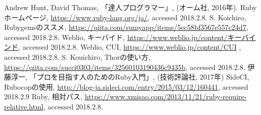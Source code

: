 \begin{thebibliography}{9}
 Andrew Hunt, David Thomas, 「達人プログラマー」, (オーム社, 2016年).
 Ruby ホームページ, \url{https://www.ruby-lang.org/ja/}, accessed 2018.2.8.
 S. Koichiro, Rubygemsのススメ, \url{https://qiita.com/sumyapp/items/5ec58bf3567e557c24d7}, accessed 2018.2.8.
 Weblio, キーバイド, \url{https://www.weblio.jp/content/キーバインド}, accessed 2018.2.8.
 Weblio, CUI, \url{https://www.weblio.jp/content/CUI} , accessed 2018.2.8.
 S. Kouichiro, Thorの使い方, \url{https://qiita.com/succi0303/items/32560103190436c9435b}, accessed 2018.2.8.
 伊藤淳一, 「プロを目指す人のためのRuby入門」, (技術評論社, 2017年)
 SideCI, Rubocopの使用, \url{http://blog-ja.sideci.com/entry/2015/03/12/160441}, accessed 2018.2.9
 Ruby, 相対パス, \url{https://www.xmisao.com/2013/11/21/ruby-require-relative.html}, accessed 2018.2.8.
\end{thebibliography} 